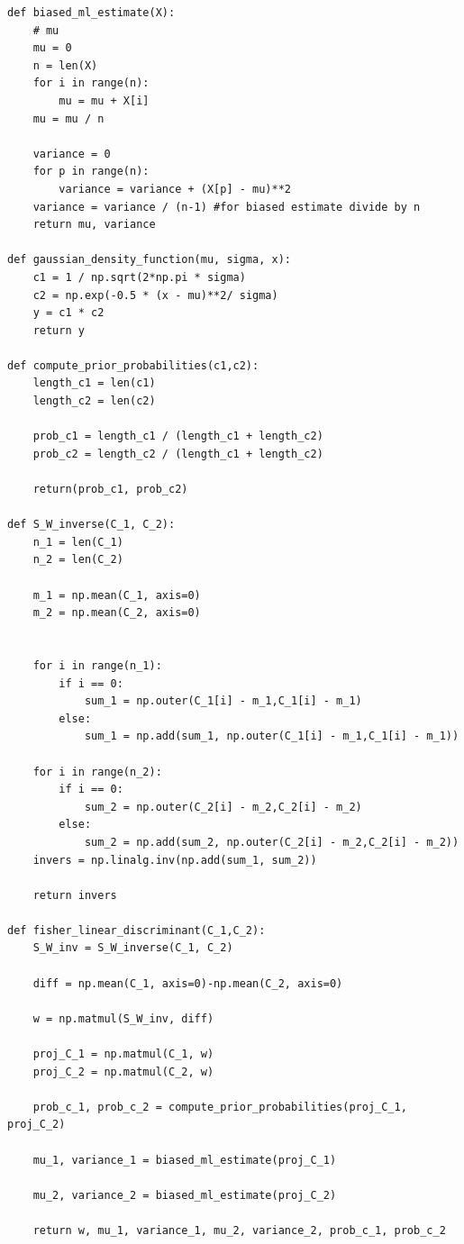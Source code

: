 \begin{lstlisting}
def biased_ml_estimate(X):
    # mu
    mu = 0
    n = len(X)
    for i in range(n):
        mu = mu + X[i]
    mu = mu / n
    
    variance = 0
    for p in range(n):
        variance = variance + (X[p] - mu)**2
    variance = variance / (n-1) #for biased estimate divide by n
    return mu, variance

def gaussian_density_function(mu, sigma, x):
    c1 = 1 / np.sqrt(2*np.pi * sigma)
    c2 = np.exp(-0.5 * (x - mu)**2/ sigma)
    y = c1 * c2
    return y    

def compute_prior_probabilities(c1,c2):
    length_c1 = len(c1)
    length_c2 = len(c2)
    
    prob_c1 = length_c1 / (length_c1 + length_c2)
    prob_c2 = length_c2 / (length_c1 + length_c2)
    
    return(prob_c1, prob_c2)
    
def S_W_inverse(C_1, C_2):
    n_1 = len(C_1)
    n_2 = len(C_2)
    
    m_1 = np.mean(C_1, axis=0)
    m_2 = np.mean(C_2, axis=0)
    

    for i in range(n_1):
        if i == 0:
            sum_1 = np.outer(C_1[i] - m_1,C_1[i] - m_1)
        else:
            sum_1 = np.add(sum_1, np.outer(C_1[i] - m_1,C_1[i] - m_1))
    
    for i in range(n_2):
        if i == 0:
            sum_2 = np.outer(C_2[i] - m_2,C_2[i] - m_2)
        else:
            sum_2 = np.add(sum_2, np.outer(C_2[i] - m_2,C_2[i] - m_2))
    invers = np.linalg.inv(np.add(sum_1, sum_2))
    
    return invers

def fisher_linear_discriminant(C_1,C_2):
    S_W_inv = S_W_inverse(C_1, C_2)
    
    diff = np.mean(C_1, axis=0)-np.mean(C_2, axis=0)
    
    w = np.matmul(S_W_inv, diff)
    
    proj_C_1 = np.matmul(C_1, w)
    proj_C_2 = np.matmul(C_2, w)
    
    prob_c_1, prob_c_2 = compute_prior_probabilities(proj_C_1, proj_C_2)
    
    mu_1, variance_1 = biased_ml_estimate(proj_C_1)
    
    mu_2, variance_2 = biased_ml_estimate(proj_C_2)
    
    return w, mu_1, variance_1, mu_2, variance_2, prob_c_1, prob_c_2


\end{lstlisting}
